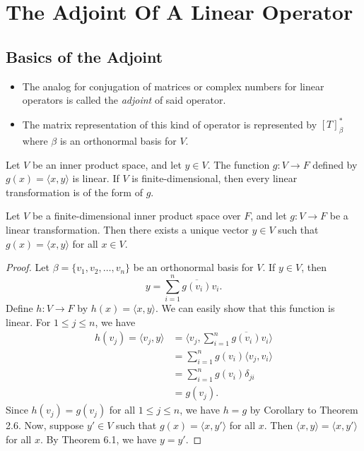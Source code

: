 \section{The Adjoint Of A Linear Operator}

\subsection{Basics of the Adjoint}

\begin{itemize}
    \item The analog for conjugation of matrices or complex numbers for linear operators is called the \textit{adjoint} of said operator.
    \item The matrix representation of this kind of operator is represented by \( [T]_{\beta}^{*} \) where \( \beta \) is an orthonormal basis for \( V  \).
\end{itemize}

Let \( V  \) be an inner product space, and let \( y \in V  \). The function \( g: V \to F  \) defined by \( g(x) = \langle x , y \rangle \) is linear. If \( V  \) is finite-dimensional, then every linear transformation is of the form of \( g \).

\begin{theorem}
    Let \( V  \) be a finite-dimensional inner product space over \( F  \), and let \( g: V \to F  \) be a linear transformation. Then there exists a unique vector \( y \in V  \) such that \( g(x) = \langle x , y \rangle \) for all \( x \in V  \).
\end{theorem}
\begin{proof}
Let \( \beta = \{ {v}_{1}, {v}_{2}, \dots, {v}_{n} \}  \) be an orthonormal basis for \( V  \). If \( y \in V  \), then
\[  y = \sum_{ i=1  }^{ n  } \overline{g({v}_{i})} {v}_{i}. \]
Define \( h: V \to F  \) by \( h(x) = \langle x , y \rangle \). We can easily show that this function is linear. For \( 1 \leq j \leq n \), we have
\begin{align*}
    h({v}_{j}) = \langle {v}_{j} , y \rangle &= \Big\langle {v}_{j}, \sum_{ i=1  }^{ n } \overline{g({v}_{i})} {v}_{i} \Big\rangle \\
                                             &=\sum_{ i=1 }^{ n } g({v}_{i}) \langle {v}_{j} , {v}_{i} \rangle \\
                                             &= \sum_{ i=1 }^{ n } g({v}_{i}) {\delta}_{ji} \\
                                             &= g({v}_{j}).
\end{align*}
Since \( h({v}_{j} ) = g({v}_{j}) \) for all \( 1 \leq j \leq n \), we have \( h = g  \) by Corollary to Theorem 2.6.  
    Now, suppose \( y' \in V  \) such that \( g(x) = \langle x , y' \rangle \) for all \( x  \). Then \( \langle x , y \rangle = \langle x , y' \rangle \) for all \( x  \). By Theorem 6.1, we have \( y = y' \).
\end{proof}

